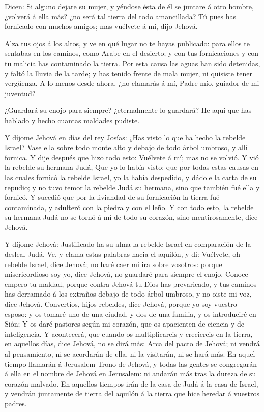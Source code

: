  Dicen: Si alguno dejare su mujer, y yéndose ésta de él se
juntare á otro hombre, ¿volverá á ella más? ¿no será tal tierra del todo
amancillada? Tú pues has fornicado con muchos amigos; mas vuélvete á mí,
dijo Jehová.

 Alza tus ojos á los altos, y ve en qué lugar no te hayas
publicado: para ellos te sentabas en los caminos, como Arabe en el
desierto; y con tus fornicaciones y con tu malicia has contaminado la
tierra.  Por esta causa las aguas han sido detenidas, y
faltó la lluvia de la tarde; y has tenido frente de mala mujer, ni
quisiste tener vergüenza.  A lo menos desde ahora, ¿no
clamarás á mí, Padre mío, guiador de mi juventud?

 ¿Guardará su enojo para siempre? ¿eternalmente lo guardará?
He aquí que has hablado y hecho cuantas maldades pudiste.

 Y díjome Jehová en días del rey Josías: ¿Has visto lo que
ha hecho la rebelde Israel? Vase ella sobre todo monte alto y debajo de
todo árbol umbroso, y allí fornica.  Y dije después que hizo
todo esto: Vuélvete á mí; mas no se volvió. Y vió la rebelde su hermana
Judá,  Que yo lo había visto; que por todas estas causas en
las cuales fornicó la rebelde Israel, yo la había despedido, y dádole la
carta de su repudio; y no tuvo temor la rebelde Judá su hermana, sino
que también fué ella y fornicó.  Y sucedió que por la
liviandad de su fornicación la tierra fué contaminada, y adulteró con la
piedra y con el leño.  Y con todo esto, la rebelde su
hermana Judá no se tornó á mí de todo su corazón, sino mentirosamente,
dice Jehová.

 Y díjome Jehová: Justificado ha su alma la rebelde Israel
en comparación de la desleal Judá.  Ve, y clama estas
palabras hacia el aquilón, y di: Vuélvete, oh rebelde Israel, dice
Jehová; no haré caer mi ira sobre vosotros: porque misericordioso soy
yo, dice Jehová, no guardaré para siempre el enojo.  Conoce
empero tu maldad, porque contra Jehová tu Dios has prevaricado, y tus
caminos has derramado á los extraños debajo de todo árbol umbroso, y no
oiste mi voz, dice Jehová.  Convertíos, hijos rebeldes,
dice Jehová, porque yo soy vuestro esposo: y os tomaré uno de una
ciudad, y dos de una familia, y os introduciré en Sión;  Y
os daré pastores según mi corazón, que os apacienten de ciencia y de
inteligencia.  Y acontecerá, que cuando os multiplicareis y
creciereis en la tierra, en aquellos días, dice Jehová, no se dirá más:
Arca del pacto de Jehová; ni vendrá al pensamiento, ni se acordarán de
ella, ni la visitarán, ni se hará más.  En aquel tiempo
llamarán á Jerusalem Trono de Jehová, y todas las gentes se congregarán
á ella en el nombre de Jehová en Jerusalem: ni andarán más tras la
dureza de su corazón malvado.  En aquellos tiempos irán de
la casa de Judá á la casa de Israel, y vendrán juntamente de tierra del
aquilón á la tierra que hice heredar á vuestros padres.

